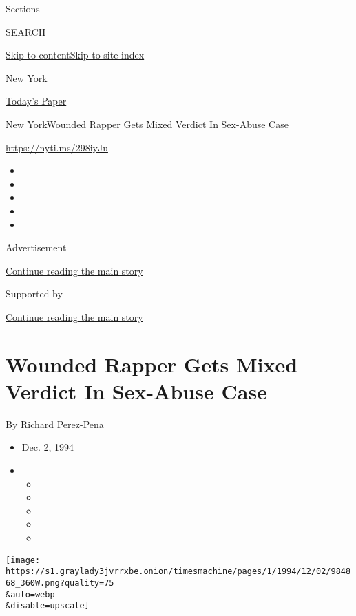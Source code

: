 Sections

SEARCH

\protect\hyperlink{site-content}{Skip to
content}\protect\hyperlink{site-index}{Skip to site index}

\href{https://www.nytimes3xbfgragh.onion/section/nyregion}{New York}

\href{https://myaccount.nytimes3xbfgragh.onion/auth/login?response_type=cookie\&client_id=vi}{}

\href{https://www.nytimes3xbfgragh.onion/section/todayspaper}{Today's
Paper}

\href{/section/nyregion}{New York}\textbar{}Wounded Rapper Gets Mixed
Verdict In Sex-Abuse Case

\url{https://nyti.ms/298iyJu}

\begin{itemize}
\item
\item
\item
\item
\item
\end{itemize}

Advertisement

\protect\hyperlink{after-top}{Continue reading the main story}

Supported by

\protect\hyperlink{after-sponsor}{Continue reading the main story}

\hypertarget{wounded-rapper-gets-mixed-verdict-in-sex-abuse-case}{%
\section{Wounded Rapper Gets Mixed Verdict In Sex-Abuse
Case}\label{wounded-rapper-gets-mixed-verdict-in-sex-abuse-case}}

By Richard Perez-Pena

\begin{itemize}
\item
  Dec. 2, 1994
\item
  \begin{itemize}
  \item
  \item
  \item
  \item
  \item
  \end{itemize}
\end{itemize}

\texttt{[image: https://s1.graylady3jvrrxbe.onion/timesmachine/pages/1/1994/12/02/984868\_360W.png?quality=75\\\&auto=webp\\\&disable=upscale]}

